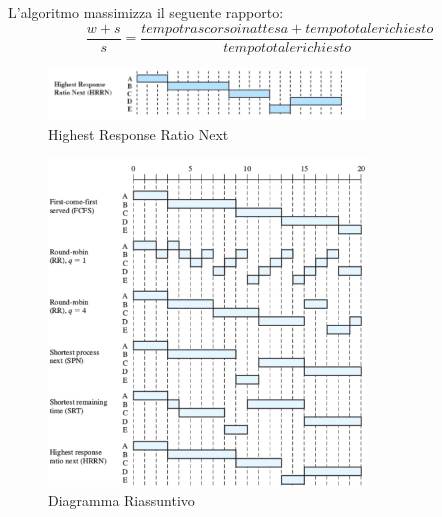 \documentclass[11pt]{article}
\begin{document}
    L'algoritmo massimizza il seguente rapporto:
    \begin{equation}
        \frac{w+s}{s} = \frac{tempo trascorso in attesa + tempo totale richiesto}{tempo totale richiesto}
    \end{equation}
    \begin{figure}[H]
        \centering
        \includegraphics[width=0.75\textwidth]{immagini/HRRN}
        \caption{Highest Response Ratio Next}
    \end{figure}
    \begin{figure}[H]
        \centering
        \includegraphics[width=0.75\textwidth]{immagini/RiassuntoScheduling}
        \caption{Diagramma Riassuntivo}
    \end{figure}
\end{document}
